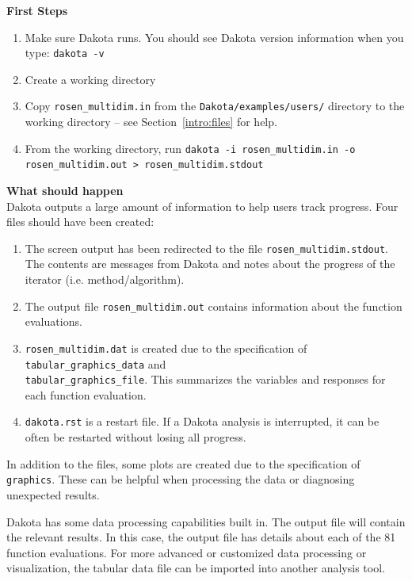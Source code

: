 {\bf First Steps}
\begin{enumerate}
  \item Make sure Dakota runs. You should see Dakota version information
   when you type: \texttt{dakota -v}
  \item Create a working directory 
  \item Copy \texttt{rosen\_multidim.in} from the \texttt{Dakota/examples/users/}
    directory to the working directory -- see Section~\ref{intro:files} for help.
  \item From the working directory, run \texttt{dakota -i 
    rosen\_multidim.in -o rosen\_multidim.out > rosen\_multidim.stdout}
\end{enumerate}

{\bf What should happen} \\
Dakota outputs a large amount of information to help users track  progress. 
Four files should have been created:
\begin{enumerate}
  \item The screen output has been redirected to the file 
\texttt{rosen\_multidim.stdout}. \\
  The contents are messages from Dakota and notes about the 
progress of the iterator (i.e. method/algorithm).
  \item The output file \texttt{rosen\_multidim.out} 
contains information about the function evaluations.
  \item \texttt{rosen\_multidim.dat} is created due to the 
specification of \texttt{tabular\_graphics\_data} and \\
\texttt{tabular\_graphics\_file}. This summarizes 
the variables and responses for each function evaluation.
  \item \texttt{dakota.rst} is a restart file. If a Dakota 
analysis is interrupted, it can be often be restarted without 
losing all progress.
\end{enumerate}
In addition to the files, some plots are created due to the specification 
of \texttt{graphics}. These can be helpful when processing the 
data or diagnosing unexpected results.

Dakota has some data processing capabilities built in. The output file 
will contain the relevant results. In this case, the output file has details
about each of the 81 function evaluations. 
For more advanced or customized data 
processing or visualization, the tabular data file can be imported into 
another analysis tool. 

